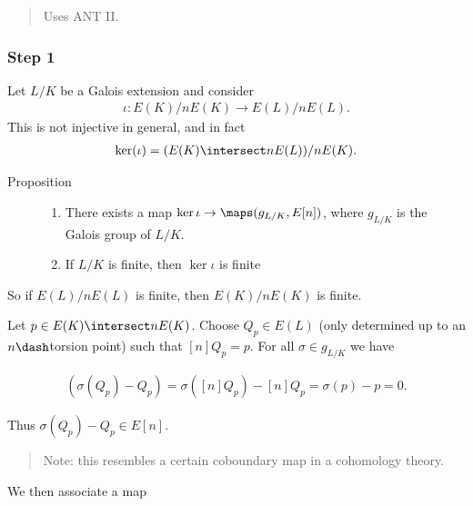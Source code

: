 \begin{quote}
Uses ANT II.
\end{quote}

\hypertarget{step-1-1}{%
\subsubsection{Step 1}\label{step-1-1}}

Let \(L/K\) be a Galois extension and consider
\begin{align*}
\iota: E(K)/n E(K) \to E(L)/ n E(L)
.\end{align*} This is not injective in general, and in fact
\begin{align*}
\ker(\iota) = (E(K) \intersect nE(L))/ nE(K)
.\end{align*}

\begin{description}
\item[Proposition]
\hfill

\begin{enumerate}
\def\labelenumi{\alph{enumi}.}
\item
  There exists a map \(\ker \iota \to \maps(g_{L/K}, E[n])\), where
  \(g_{L/K}\) is the Galois group of \(L/K\).
\item
  If \(L/K\) is finite, then \(\ker \iota\) is finite
\end{enumerate}
\end{description}

So if \(E(L) / nE(L)\) is finite, then \(E(K) / nE(K)\) is finite.

\begin{description}
\tightlist
\item[Proof]
Let \(p\in E(K) \intersect n E(K)\). Choose \(Q_p \in E(L)\) (only
determined up to an \(n\dash\)torsion point) such that \([n] Q_p = p\).
For all \(\sigma \in g_{L/K}\) we have
\end{description}

\begin{align*}
  [n] (\sigma(Q_p) - Q_p) = \sigma([n] Q_p) - [n] Q_p = \sigma(p) - p = 0
  .\end{align*}

Thus \(\sigma(Q_p) - Q_p \in E[n]\).

\begin{quote}
Note: this resembles a certain coboundary map in a cohomology theory.
\end{quote}

We then associate a map

